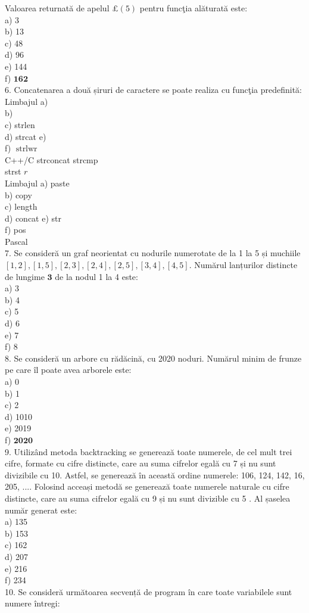Valoarea returnată de apelul $\pounds(5)$ pentru funcţia alăturată este:\\
a) 3\\
b) 13\\
c) 48\\
d) 96\\
e) 144\\
f) $\mathbf{1 6 2}$\\
6. Concatenarea a două șiruri de caractere se poate realiza cu funcţia predefinită:\\
Limbajul a)\\
b)\\
c) strlen\\
d) strcat e)\\
f) $\operatorname{strlwr}$\\
C++/C strconcat strcmp\\
strst $r$\\
Limbajul a) paste\\
b) copy\\
c) length\\
d) concat e) str\\
f) pos\\
Pascal\\
7. Se consideră un graf neorientat cu nodurile numerotate de la 1 la 5 și muchiile $[1,2],[1,5],[2,3],[2,4],[2,5],[3,4],[4,5]$. Numărul lanțurilor distincte de lungime $\mathbf{3}$ de la nodul 1 la 4 este:\\
a) 3\\
b) 4\\
c) 5\\
d) 6\\
e) 7\\
f) 8\\
8. Se consideră un arbore cu rădăcină, cu 2020 noduri. Numărul minim de frunze pe care îl poate avea arborele este:\\
a) 0\\
b) 1\\
c) 2\\
d) 1010\\
e) 2019\\
f) $\mathbf{2 0 2 0}$\\
9. Utilizând metoda backtracking se generează toate numerele, de cel mult trei cifre, formate cu cifre distincte, care au suma cifrelor egală cu 7 și nu sunt divizibile cu 10. Astfel, se generează în această ordine numerele: 106, 124, 142, 16, 205, .... Folosind acceași metodă se generează toate numerele naturale cu cifre distincte, care au suma cifrelor egală cu 9 și nu sunt divizible cu 5 . Al șaselea număr generat este:\\
a) 135\\
b) 153\\
c) 162\\
d) 207\\
e) 216\\
f) 234\\
10. Se consideră următoarea secvență de program în care toate variabilele sunt numere întregi:

